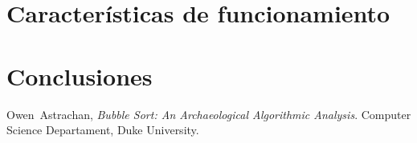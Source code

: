 \documentclass[conference]{IEEEtran}
\begin{document}
\section{Características de funcionamiento}
\label{sec:car-func}

\section{Conclusiones}
\label{sec:conc}


\begin{thebibliography}{1}
  Owen~Astrachan, \emph{Bubble Sort: An Archaeological Algorithmic
    Analysis}. Computer Science Departament, Duke University. 
\end{thebibliography}

\end{document}

